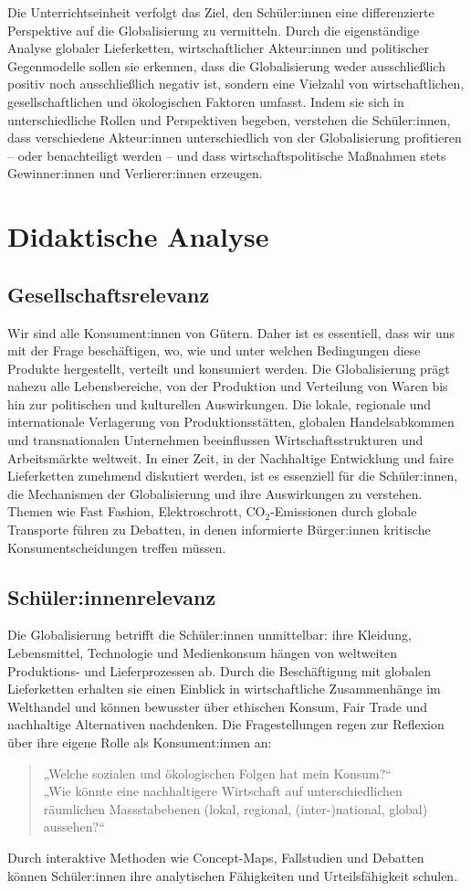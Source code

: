 Die Unterrichtseinheit verfolgt das Ziel, den Schüler:innen eine differenzierte Perspektive auf die Globalisierung zu vermitteln. Durch die eigenständige Analyse globaler Lieferketten, wirtschaftlicher Akteur:innen und politischer Gegenmodelle sollen sie erkennen, dass die Globalisierung weder ausschließlich positiv noch ausschließlich negativ ist, sondern eine Vielzahl von wirtschaftlichen, gesellschaftlichen und ökologischen Faktoren umfasst. Indem sie sich in unterschiedliche Rollen und Perspektiven begeben, verstehen die Schüler:innen, dass verschiedene Akteur:innen unterschiedlich von der Globalisierung profitieren – oder benachteiligt werden – und dass wirtschaftspolitische Maßnahmen stets Gewinner:innen und Verlierer:innen erzeugen.

\section{Didaktische Analyse}
\subsection{Gesellschaftsrelevanz}
Wir sind alle Konsument:innen von Gütern. Daher ist es essentiell, dass wir uns mit der Frage beschäftigen, wo, wie und unter welchen Bedingungen diese Produkte hergestellt, verteilt und konsumiert werden. Die Globalisierung prägt nahezu alle Lebensbereiche, von der Produktion und Verteilung von Waren bis hin zur politischen und kulturellen Auswirkungen. Die lokale, regionale und internationale Verlagerung von Produktionsstätten, globalen Handelsabkommen und transnationalen Unternehmen beeinflussen Wirtschaftsstrukturen und Arbeitsmärkte weltweit. In einer Zeit, in der Nachhaltige Entwicklung und faire Lieferketten zunehmend diskutiert werden, ist es essenziell für die Schüler:innen, die Mechanismen der Globalisierung und ihre Auswirkungen zu verstehen. Themen wie Fast Fashion, Elektroschrott, CO$_2$-Emissionen durch globale Transporte führen zu Debatten, in denen informierte Bürger:innen kritische Konsumentscheidungen treffen müssen.

\subsection{Schüler:innenrelevanz}
Die Globalisierung betrifft die Schüler:innen unmittelbar: ihre Kleidung, Lebensmittel, Technologie und Medienkonsum hängen von weltweiten Produktions- und Lieferprozessen ab. Durch die Beschäftigung mit globalen Lieferketten erhalten sie einen Einblick in wirtschaftliche Zusammenhänge im Welthandel und können bewusster über ethischen Konsum, Fair Trade und nachhaltige Alternativen nachdenken. Die Fragestellungen regen zur Reflexion über ihre eigene Rolle als Konsument:innen an:
\begin{quote}
„Welche sozialen und ökologischen Folgen hat mein Konsum?“\\
„Wie könnte eine nachhaltigere Wirtschaft auf unterschiedlichen räumlichen Massstabebenen (lokal, regional, (inter-)national, global) aussehen?“
\end{quote}
Durch interaktive Methoden wie Concept-Maps, Fallstudien und Debatten können Schüler:innen ihre analytischen Fähigkeiten und Urteilsfähigkeit schulen.

